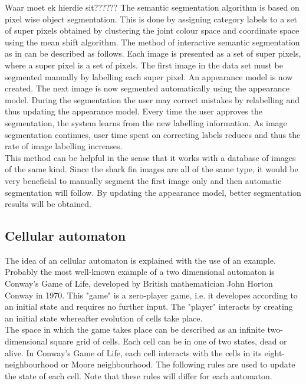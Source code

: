\documentclass[a4paper,10pt]{article}
\begin{document}
Waar moet ek hierdie sit??????
The semantic segmentation
algorithm is based on pixel wise object segmentation.  This is done by 
assigning category labels to a set of super pixels obtained by clustering the
joint colour space and coordinate space using the mean shift algorithm.
The method of interactive semantic segmentation as in \cite{RF} can be described
as follows.  Each image is presented as a set of super pixels, where 
a super pixel is a set of pixels.  The first image in the data set must be
segmented manually by labelling each super pixel. An appearance model is 
now created.  The next image is now segmented automatically using the appearance
model.  During the segmentation the user may correct mistakes by 
relabelling and thus updating the appearance model.  Every time the user
approves the segmentation, the system learns from the new labelling information.
As image segmentation continues, user time spent on correcting labels reduces
and thus the rate of image labelling increases. \\

This method can be helpful in the sense that it works with a database of images
of the same kind.  Since the shark fin images are all of the same type, 
it would be very beneficial to manually segment the first image only and then
automatic segmentation will follow.  By updating the appearance model, 
better segmentation results will be obtained.  \\ 

\subsection{Cellular automaton}
\label{ca}
The idea of an cellular automaton is explained with the use of an example.
Probably the most well-known example of a two dimensional automaton is Conway's
Game of Life\cite{gol}, developed by British mathematician John Horton Conway in 1970. 
This "game" is a zero-player game, i.e. it developes according to an initial
state
and requires no further input.  The "player" interacts by creating an initial
state whereafter evolution of cells take place.  \\

The  space in  which the  game  takes place  can  be described  as an  infinite
two-dimensional square grid of cells.  Each cell can
be in one of two states, dead  or alive.  In Conway's Game of Life, each
cell   interacts  with   the  cells   in  its   eight-neighbourhood  or   Moore
neighbourhood.  The following  rules are used to update the state of each cell.
Note that these rules will differ for each automaton.
\end{document}
